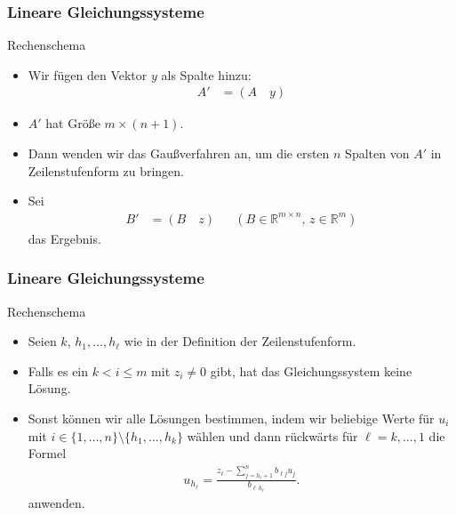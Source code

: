 \documentclass{beamer}
\newcommand\RR{\mathbb R}
\renewcommand{\ae}{\"a}
\renewcommand{\oe}{\"o}
\newcommand{\ue}{\"u}
\newcommand{\mytitle}{Lineare Gleichungssysteme}
\begin{document}
\begin{frame}\frametitle{\mytitle}
	\begin{block}{Rechenschema}
		\begin{itemize}
			\item Wir f\ue gen den Vektor $y$ als Spalte hinzu:
				\begin{align*}
					A'&=(A\quad y)
				\end{align*}
			\item $A'$ hat Gr\oe\ss e $m\times(n+1)$.
			\item Dann wenden wir das Gau\ss verfahren an, um die ersten $n$ Spalten von $A'$ in Zeilenstufenform zu bringen.
			\item Sei
				\begin{align*}
					B'&=(B\quad z)&&(B\in\RR^{m\times n},\,z\in\RR^m)
				\end{align*}
				das Ergebnis.
		\end{itemize}
	\end{block}
\end{frame}

\begin{frame}\frametitle{\mytitle}
	\begin{block}{Rechenschema}
		\begin{itemize}
			\item Seien $k$, $h_1,\ldots,h_\ell$ wie in der Definition der Zeilenstufenform.
			\item Falls es ein $k<i\leq m$ mit $z_i\neq0$ gibt, hat das Gleichungssystem keine L\oe sung.
			\item Sonst k\oe nnen wir alle L\oe sungen bestimmen, indem wir beliebige Werte f\ue r $u_i$ mit $i\in\{1,\ldots,n\}\setminus\{h_1,\ldots,h_k\}$ w\ae hlen und dann r\ue ckw\ae rts f\ue r $\ell=k,\ldots,1$ die Formel
				\begin{align*}
					u_{h_\ell}=\frac{z_\ell-\sum^n_{j=h_{\ell}+1}b_{\ell j}u_j}{b_{\ell\, h_\ell}}.
				\end{align*}
				anwenden.
		\end{itemize}
	\end{block}
\end{frame}
\end{document}
